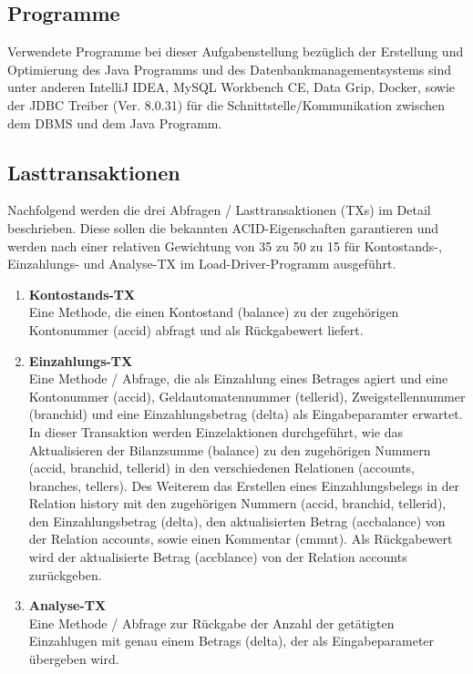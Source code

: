 \subsection{Programme}\label{subsec:programme}
Verwendete Programme bei dieser Aufgabenstellung bezüglich der Erstellung und Optimierung des Java Programms und des Datenbankmanagementsystems sind unter anderen IntelliJ IDEA, MySQL Workbench CE, Data Grip, Docker, sowie der JDBC Treiber (Ver. 8.0.31) für die Schnittstelle/Kommunikation zwischen dem DBMS und dem Java Programm.
\subsection{Lasttransaktionen}\label{subsec:lasttransaktionen}
Nachfolgend werden die drei Abfragen / Lasttransaktionen (TXs) im Detail beschrieben.
Diese sollen die bekannten ACID-Eigenschaften garantieren und werden nach einer relativen Gewichtung von 35 zu 50 zu 15 für Kontostands-, Einzahlungs- und Analyse-TX im Load-Driver-Programm ausgeführt.
\begin{enumerate}
    \item \textbf{Kontostands-TX} \\
    Eine Methode, die einen Kontostand (balance) zu der zugehörigen Kontonummer (accid) abfragt und als Rückgabewert liefert.
    \item \textbf{Einzahlungs-TX} \\
    Eine Methode / Abfrage, die als Einzahlung eines Betrages agiert und eine Kontonummer (accid), Geldautomatennummer (tellerid), Zweigstellennummer (branchid) und eine Einzahlungsbetrag (delta) als Eingabeparamter erwartet.
    In dieser Transaktion werden Einzelaktionen durchgeführt, wie das Aktualisieren der Bilanzsumme (balance) zu den zugehörigen Nummern (accid, branchid, tellerid) in den verschiedenen Relationen (accounts, branches, tellers).
    Des Weiterem das Erstellen eines Einzahlungsbelegs in der Relation history mit den zugehörigen Nummern (accid, branchid, tellerid), den Einzahlungsbetrag (delta), den aktualisierten Betrag (accbalance) von der Relation accounts, sowie einen Kommentar (cmmnt).
    Als Rückgabewert wird der aktualisierte Betrag (accblance) von der Relation accounts zurückgeben.
    \item \textbf{Analyse-TX} \\
    Eine Methode / Abfrage zur Rückgabe der Anzahl der getätigten Einzahlugen mit genau einem Betrags (delta), der als Eingabeparameter übergeben wird.
\end{enumerate}

